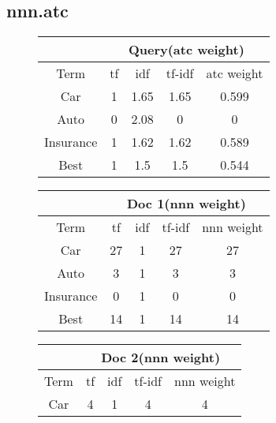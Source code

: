 \documentclass[11pt]{article}
\begin{document}
\subsection*{nnn.atc}
\begin{figure}[H]
  \begin{minipage}{0.5\linewidth}
    \begin{table}[H]
      \centering
      \begin{tabular}{|c|c|c|c|c|} \hline
        & \multicolumn{4}{|c|}{Query(atc weight)}\\ \hline
        Term         & tf& idf  & tf-idf & atc weight \\ \hline
        Car          & 1 & 1.65 & 1.65& 0.599 \\ \hline
        Auto         & 0 & 2.08 & 0   & 0\\ \hline
        Insurance    & 1 & 1.62 & 1.62& 0.589\\ \hline
        Best         & 1 & 1.5  & 1.5 & 0.544\\ \hline
      \end{tabular}
    \end{table}
  \end{minipage}
  \begin{minipage}{0.5\linewidth}
    \begin{table}[H]
      \centering
      \begin{tabular}{|c|c|c|c|c|} \hline
        & \multicolumn{4}{|c|}{Doc 1(nnn weight)}\\ \hline
        Term     & tf & idf & tf-idf & nnn weight \\ \hline
        Car      & 27 &1& 27& 27 \\ \hline
        Auto     & 3  &1& 3& 3\\ \hline
        Insurance& 0  &1& 0& 0\\ \hline
        Best     & 14 &1& 14& 14\\ \hline
      \end{tabular}
    \end{table}
  \end{minipage}
  \begin{minipage}{0.5\linewidth}
    \begin{table}[H]
      \centering
      \begin{tabular}{|c|c|c|c|c|} \hline
        & \multicolumn{4}{|c|}{Doc 2(nnn weight)}\\ \hline
        Term     & tf & idf & tf-idf & nnn weight \\ \hline
        Car      & 4  &1    & 4 & 4 \\ \hline

\end{tabular}
\end{table}
\end{minipage}
\end{figure}
\end{document}
